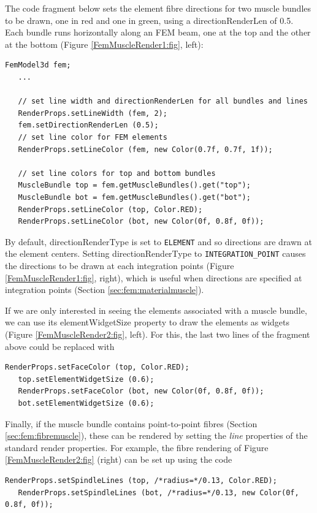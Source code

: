 The code fragment below sets the element fibre directions for two
muscle bundles to be drawn, one in red and one in green, using a {\sf
directionRenderLen} of 0.5.  Each bundle runs horizontally along an
FEM beam, one at the top and the other at the bottom
(Figure \ref{FemMuscleRender1:fig}, left):
%
\begin{lstlisting}[]
   FemModel3d fem;
   ...

   // set line width and directionRenderLen for all bundles and lines
   RenderProps.setLineWidth (fem, 2);
   fem.setDirectionRenderLen (0.5);
   // set line color for FEM elements
   RenderProps.setLineColor (fem, new Color(0.7f, 0.7f, 1f));

   // set line colors for top and bottom bundles
   MuscleBundle top = fem.getMuscleBundles().get("top");
   MuscleBundle bot = fem.getMuscleBundles().get("bot");
   RenderProps.setLineColor (top, Color.RED);
   RenderProps.setLineColor (bot, new Color(0f, 0.8f, 0f));
\end{lstlisting}
%
By default, {\sf directionRenderType} is set to {\tt ELEMENT} and so
directions are drawn at the element centers. Setting {\sf
directionRenderType} to {\tt INTEGRATION\_POINT} causes the directions
to be drawn at each integration points
(Figure \ref{FemMuscleRender1:fig}, right), which is useful when
directions are specified at integration points
(Section \ref{sec:fem:materialmuscle}).

If we are only interested in seeing the elements associated with a
muscle bundle, we can use its {\sf elementWidgetSize} property to draw
the elements as widgets (Figure \ref{FemMuscleRender2:fig}, left).
For this, the last two lines of the fragment above could be replaced
with
%
\begin{lstlisting}[]
   RenderProps.setFaceColor (top, Color.RED);
   top.setElementWidgetSize (0.6);
   RenderProps.setFaceColor (bot, new Color(0f, 0.8f, 0f));
   bot.setElementWidgetSize (0.6);
\end{lstlisting}
%

Finally, if the muscle bundle contains point-to-point fibres
(Section \ref{sec:fem:fibremuscle}), these can be rendered by setting
the {\it line} properties of the standard render properties. For
example, the fibre rendering of Figure \ref{FemMuscleRender2:fig}
(right) can be set up using the code
%
\begin{lstlisting}[]
   RenderProps.setSpindleLines (top, /*radius=*/0.13, Color.RED);
   RenderProps.setSpindleLines (bot, /*radius=*/0.13, new Color(0f, 0.8f, 0f));
\end{lstlisting}
%

